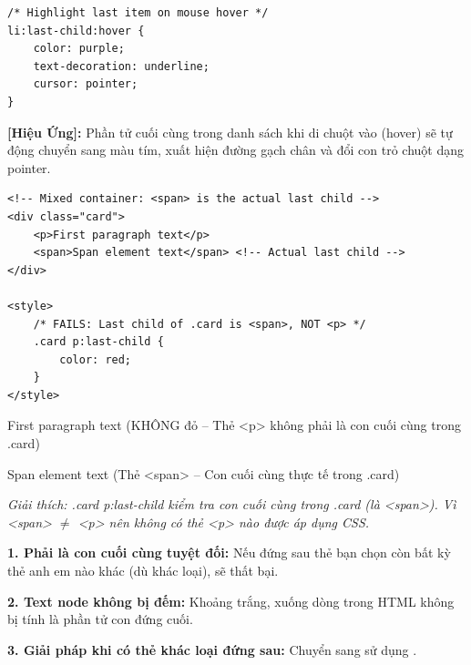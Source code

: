 \begin{codeWindow}
\begin{lstlisting}[language=CSS3]
/* Highlight last item on mouse hover */
li:last-child:hover {
    color: purple;
    text-decoration: underline;
    cursor: pointer;
}
\end{lstlisting}
\end{codeWindow}

\begin{tipBox}
\textbf{[Hiệu Ứng]:} Phần tử cuối cùng trong danh sách khi di chuột vào (hover) sẽ tự động chuyển sang màu tím, xuất hiện đường gạch chân và đổi con trỏ chuột dạng pointer.
\end{tipBox}

\begin{codeWindow}
\begin{lstlisting}[language=HTML5]
<!-- Mixed container: <span> is the actual last child -->
<div class="card">
    <p>First paragraph text</p>
    <span>Span element text</span> <!-- Actual last child -->
</div>

<style>
    /* FAILS: Last child of .card is <span>, NOT <p> */
    .card p:last-child {
        color: red;
    }
</style>
\end{lstlisting}
\end{codeWindow}

\begin{browserWindow}
\sffamily\small
First paragraph text {\scriptsize\textcolor{gray!60}{(KHÔNG đỏ -- Thẻ <p> không phải là con cuối cùng trong .card)}} \par\vspace{2pt}
Span element text {\scriptsize\textcolor{gray!60}{(Thẻ <span> -- Con cuối cùng thực tế trong .card)}} \par\vspace{4pt}
{\scriptsize\textcolor{gray!60}{\textit{Giải thích: .card p:last-child kiểm tra con cuối cùng trong .card (là <span>). Vì <span> $\neq$ <p> nên không có thẻ <p> nào được áp dụng CSS.}}}
\end{browserWindow}

\begin{warnBox}
\textbf{1. Phải là con cuối cùng tuyệt đối:} Nếu đứng sau thẻ bạn chọn còn bất kỳ thẻ anh em nào khác (dù khác loại),  sẽ thất bại.
\par\vspace{4pt}
\textbf{2. Text node không bị đếm:} Khoảng trắng, xuống dòng trong HTML không bị tính là phần tử con đứng cuối.
\par\vspace{4pt}
\textbf{3. Giải pháp khi có thẻ khác loại đứng sau:} Chuyển sang sử dụng .
\end{warnBox}

